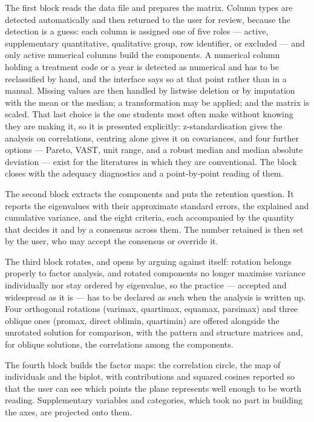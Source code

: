 \documentclass[12pt]{article}
\begin{document}
The first block reads the data file and prepares the matrix. Column types are
detected automatically and then returned to the user for review, because the
detection is a guess: each column is assigned one of five roles --- active,
supplementary quantitative, qualitative group, row identifier, or excluded ---
and only active numerical columns build the components. A numerical column
holding a treatment code or a year is detected as numerical and has to be
reclassified by hand, and the interface says so at that point rather than in a
manual. Missing values are then handled by listwise deletion or by imputation
with the mean or the median; a transformation may be applied; and the matrix is
scaled. That last choice is the one students most often make without knowing
they are making it, so it is presented explicitly: z-standardisation gives the
analysis on correlations, centring alone gives it on covariances, and four
further options --- Pareto, VAST, unit range, and a robust median and median
absolute deviation --- exist for the literatures in which they are conventional.
The block closes with the adequacy diagnostics and a point-by-point reading of
them.

The second block extracts the components and puts the retention question. It
reports the eigenvalues with their approximate standard errors, the explained
and cumulative variance, and the eight criteria, each accompanied by the
quantity that decides it and by a consensus across them. The number retained is
then set by the user, who may accept the consensus or override it.

The third block rotates, and opens by arguing against itself: rotation belongs
properly to factor analysis, and rotated components no longer maximise variance
individually nor stay ordered by eigenvalue, so the practice --- accepted and
widespread as it is --- has to be declared as such when the analysis is written
up. Four orthogonal rotations (varimax, quartimax, equamax, parsimax) and three
oblique ones (promax, direct oblimin, quartimin) are offered alongside the
unrotated solution for comparison, with the pattern and structure matrices and,
for oblique solutions, the correlations among the components.

The fourth block builds the factor maps: the correlation circle, the map of
individuals and the biplot, with contributions and squared cosines reported so
that the user can see which points the plane represents well enough to be worth
reading. Supplementary variables and categories, which took no part in building
the axes, are projected onto them.
\end{document}

